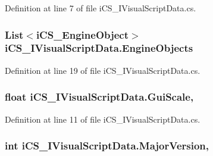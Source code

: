 Definition at line 7 of file i\+C\+S\+\_\+\+I\+Visual\+Script\+Data.\+cs.

\hypertarget{interfacei_c_s___i_visual_script_data_aa904329924cda1f4a3b775a047bd8851}{
\subsubsection[{Engine\+Objects}]{\setlength{\rightskip}{0pt plus 5cm}List$<${\bf i\+C\+S\+\_\+\+Engine\+Object}$>$ i\+C\+S\+\_\+\+I\+Visual\+Script\+Data.\+Engine\+Objects\hspace{0.3cm}{\ttfamily [get]}}}\label{interfacei_c_s___i_visual_script_data_aa904329924cda1f4a3b775a047bd8851}


Definition at line 19 of file i\+C\+S\+\_\+\+I\+Visual\+Script\+Data.\+cs.

\hypertarget{interfacei_c_s___i_visual_script_data_a66639bc05fd5e29a68d81f7c702401e4}{
\subsubsection[{Gui\+Scale}]{\setlength{\rightskip}{0pt plus 5cm}float i\+C\+S\+\_\+\+I\+Visual\+Script\+Data.\+Gui\+Scale\hspace{0.3cm}{\ttfamily [get]}, {\ttfamily [set]}}}\label{interfacei_c_s___i_visual_script_data_a66639bc05fd5e29a68d81f7c702401e4}


Definition at line 11 of file i\+C\+S\+\_\+\+I\+Visual\+Script\+Data.\+cs.

\hypertarget{interfacei_c_s___i_visual_script_data_a7e80330b2e190b3fba47684d6539d337}{
\subsubsection[{Major\+Version}]{\setlength{\rightskip}{0pt plus 5cm}int i\+C\+S\+\_\+\+I\+Visual\+Script\+Data.\+Major\+Version\hspace{0.3cm}{\ttfamily [get]}, {\ttfamily [set]}}}\label{interfacei_c_s___i_visual_script_data_a7e80330b2e190b3fba47684d6539d337}


